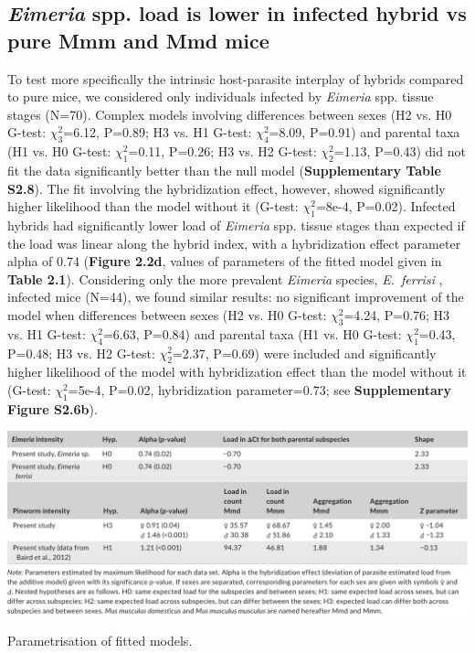 \subsection{\textit{Eimeria} spp. load is lower in infected hybrid vs pure Mmm and Mmd mice} 
To test more specifically the intrinsic host-parasite interplay of hybrids compared to pure mice, we considered only individuals infected by \textit{Eimeria} spp. tissue stages (N=70). Complex models involving differences between sexes (H2 vs. H0 G-test: $\chi_{3}^{2}$=6.12, P=0.89; H3 vs. H1 G-test: $\chi_{4}^{2}$=8.09, P=0.91) and parental taxa (H1 vs. H0 G-test: $\chi_{1}^{2}$=0.11, P=0.26; H3 vs. H2 G-test: $\chi_{2}^{2}$=1.13, P=0.43) did not fit the data significantly better than the null model (\textbf{Supplementary Table S2.8}). The fit involving the hybridization effect, however, showed significantly higher likelihood than the model without it (G-test: $\chi_{1}^{2}$=8e-4, P=0.02). Infected hybrids had significantly lower load of \textit{Eimeria} spp. tissue stages than expected if the load was linear along the hybrid index, with a hybridization effect parameter alpha of 0.74 (\textbf{Figure 2.2d}, values of parameters of the fitted model given in \textbf{Table 2.1}). Considering only the more prevalent \textit{Eimeria} species, \textit{E.~ferrisi} , infected mice (N=44), we found similar results: no significant improvement of the model when differences between sexes (H2 vs. H0 G-test: $\chi_{3}^{2}$=4.24, P=0.76; H3 vs. H1 G-test: $\chi_{4}^{2}$=6.63, P=0.84) and parental taxa (H1 vs. H0 G-test: $\chi_{1}^{2}$=0.43, P=0.48; H3 vs. H2 G-test: $\chi_{2}^{2}$=2.37, P=0.69) were included and significantly higher likelihood of the model with hybridization effect than the model without it (G-test: $\chi_{1}^{2}$=5e-4, P=0.02, hybridization parameter=0.73; see \textbf{Supplementary Figure S2.6b}). 

\begin{landscape}
\begin{table}
	\centering
	\includegraphics[width=\linewidth,height=\textheight,keepaspectratio]{images/2article1/Table1_notrot.pdf}
	\caption{Parametrisation of fitted models.}
\end{table}
\end{landscape}

